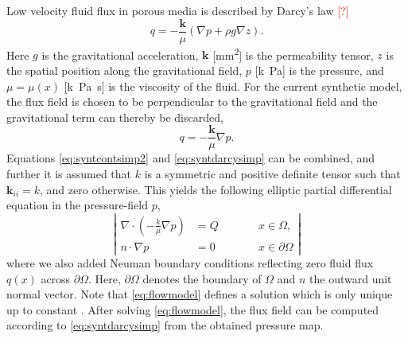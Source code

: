\documentclass[paper=a4, fontsize=11pt,parskip=half,headings=small]{scrartcl}
\newcommand{\missingsource}{\textcolor{red}{[?]}}
\begin{document}
	Low velocity fluid flux in porous media is described by Darcy's law \missingsource
	\begin{equation}
		q = -\frac{\mathbf{k}}{\mu} \left( \nabla p + \rho g  \nabla z \right).
	\end{equation}
	Here $g$ is the gravitational acceleration, $\mathbf{k}$ [\si{\square\milli\meter}] is the permeability tensor, $z$ is the spatial position along the gravitational field, $p$ [\si{k\pascal}] is the pressure, and $\mu = \mu(x)$ [\si{k\pascal\second}] is the viscosity of the fluid. 
	For the current synthetic model, the flux field is chosen to be perpendicular to the gravitational field and the gravitational term can thereby be discarded,
	\begin{equation}
		q = -\frac{\mathbf{k}}{\mu} \nabla p.
		\label{eq:syntdarcysimp}
	\end{equation}
	Equations \eqref{eq:syntcontsimp2} and \eqref{eq:syntdarcysimp} can be combined, and further it is assumed that $k$ is a symmetric and positive definite tensor such that $\mathbf{k}_{ii} = k$, and zero otherwise.
	This yields the following elliptic partial differential equation in the pressure-field $p$,
	\begin{equation}
		\left\vert
		\begin{alignedat}{2}
			\nabla \cdot \left( -\frac{k}{\mu} \nabla p \right) &= Q  \qquad &&x \in \Omega, \\
			n \cdot \nabla p &=0 &&x \in \partial \Omega
		\end{alignedat}
		\right\vert 
		\label{eq:flowmodel}
	\end{equation}
	where we also added Neuman boundary conditions reflecting zero fluid flux $q(x)$ across $\partial \Omega$.
	Here, $\partial \Omega$ denotes the boundary of $\Omega$ and $n$ the outward unit normal vector. 
	Note that \eqref{eq:flowmodel} defines a solution which is only unique up to constant \cite{evans98}.
	After solving \eqref{eq:flowmodel}, the flux field can be computed according to \eqref{eq:syntdarcysimp} from the obtained pressure map. 
	
	
\end{document}
